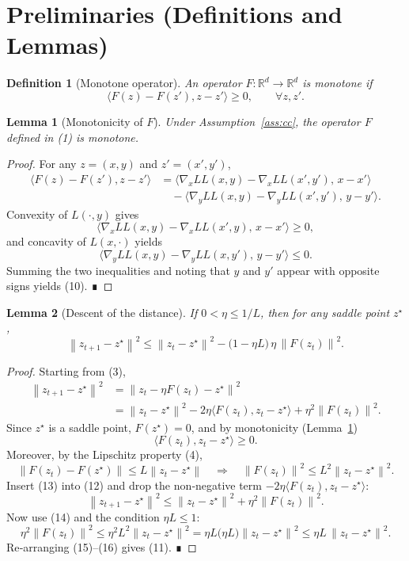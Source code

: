 \documentclass{article}
\newtheorem{lemma}{Lemma}
\newtheorem{definition}{Definition}
\newcommand{\gradx}{\nabla_{x} L}
\newcommand{\grady}{\nabla_{y} L}
\newcommand{\F}{F}
\newcommand{\z}{z}
\newcommand{\zz}{z^{\star}}
\newcommand{\norm}[1]{\left\|#1\right\|}
\begin{document}
\section*{Preliminaries (Definitions and Lemmas)}
\begin{definition}[Monotone operator]
An operator $\F:\mathbb{R}^{d}\to\mathbb{R}^{d}$ is monotone if
\[
\langle \F(\z)-\F(\z'),\z-\z'\rangle\ge 0,\qquad\forall\z,\z'.
\tag{10}
\]
\end{definition}
\begin{lemma}[Monotonicity of $\F$]\label{lem:monotone}
Under Assumption~\ref{ass:cc}, the operator $\F$ defined in (1) is monotone.
\end{lemma}
\begin{proof}
For any $\z=(x,y)$ and $\z'=(x',y')$,
\[
\begin{aligned}
\langle \F(\z)-\F(\z'),\z-\z'\rangle
&=\langle \gradx L(x,y)-\gradx L(x',y'),\,x-x'\rangle\\
&\quad -\langle \grady L(x,y)-\grady L(x',y'),\,y-y'\rangle .
\end{aligned}
\]
Convexity of $L(\cdot,y)$ gives 
\[
\langle \gradx L(x,y)-\gradx L(x',y),\,x-x'\rangle\ge0,
\]
and concavity of $L(x,\cdot)$ yields
\[
\langle \grady L(x,y)-\grady L(x,y'),\,y-y'\rangle\le0.
\]
Summing the two inequalities and noting that $y$ and $y'$ appear with opposite signs yields (10). ∎
\end{proof}
\begin{lemma}[Descent of the distance]\label{lem:descent}
If $0<\eta\le 1/L$, then for any saddle point $\zz$,
\[
\norm{\z_{t+1}-\zz}^{2}
\le \norm{\z_{t}-\zz}^{2}
- \bigl(1-\eta L\bigr)\,\eta\,\norm{\F(\z_{t})}^{2}.
\tag{11}
\]
\end{lemma}
\begin{proof}
Starting from (3),
\[
\begin{aligned}
\norm{\z_{t+1}-\zz}^{2}
&=\norm{\z_{t}-\eta\F(\z_{t})-\zz}^{2}\\
&=\norm{\z_{t}-\zz}^{2}
-2\eta\langle \F(\z_{t}),\z_{t}-\zz\rangle
+\eta^{2}\norm{\F(\z_{t})}^{2}.
\tag{12}
\end{aligned}
\]
Since $\zz$ is a saddle point, $\F(\zz)=0$, and by monotonicity (Lemma~\ref{lem:monotone})
\[
\langle \F(\z_{t}),\z_{t}-\zz\rangle\ge0.
\tag{13}
\]
Moreover, by the Lipschitz property (4),
\[
\norm{\F(\z_{t})-\F(\zz)}\le L\norm{\z_{t}-\zz}\quad\Longrightarrow\quad
\norm{\F(\z_{t})}^{2}\le L^{2}\norm{\z_{t}-\zz}^{2}.
\tag{14}
\]
Insert (13) into (12) and drop the non‑negative term $-2\eta\langle \F(\z_{t}),\z_{t}-\zz\rangle$:
\[
\norm{\z_{t+1}-\zz}^{2}
\le \norm{\z_{t}-\zz}^{2}
+\eta^{2}\norm{\F(\z_{t})}^{2}.
\tag{15}
\]
Now use (14) and the condition $\eta L\le1$:
\[
\eta^{2}\norm{\F(\z_{t})}^{2}
\le \eta^{2}L^{2}\norm{\z_{t}-\zz}^{2}
= \eta L\bigl(\eta L\bigr)\norm{\z_{t}-\zz}^{2}
\le \eta L\,\norm{\z_{t}-\zz}^{2}.
\tag{16}
\]
Re‑arranging (15)–(16) gives (11). ∎
\end{proof}
\end{document}
